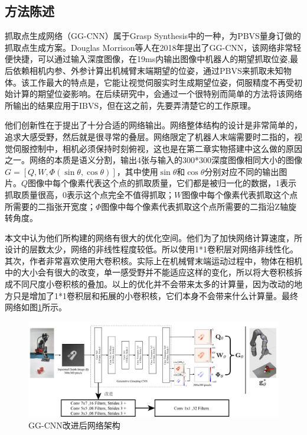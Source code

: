 \documentclass[fontset=fandol,type=bachelor,campus=harbin,bsmainpagenumberline=true]{hithesisbook}
\begin{document}
\subsection{方法陈述}
抓取点生成网络（GG-CNN）属于Grasp Synthesis中的一种，为PBVS量身订做的抓取点生成方案。Douglas Morrison等人在2018年提出了GG-CNN，该网络非常轻便快捷，可以通过输入深度图像，在19ms内输出图像中机器人的期望抓取位姿,最后依赖相机内参、外参计算出机械臂末端期望的位姿，通过PBVS来抓取未知物体\cite{morrison2018closing}。该工作最大的特点是，它能让视觉伺服实时生成期望位姿，伺服精度不再受初始计算的期望位姿影响。在后续研究中，会通过一个很特别而简单的方法将该网络所输出的结果应用于IBVS，但在这之前，先要弄清楚它的工作原理。


他们创新性在于提出了十分合适的网络输出。网络整体结构的设计是非常简单的，追求大感受野，然后就是很寻常的叠层。网络限定了机器人末端需要时二指的，视觉伺服控制中，相机必须保持时刻俯视，这也是在第二章实物搭建中这么做的原因之一。网络的本质是语义分割，输出4张与输入的300*300深度图像相同大小的图像$G=\left[ Q,W,\varPhi \left( \sin \theta ,\cos \theta \right) \right]$，其中使用$\sin \theta$和$\cos \theta$分别对应不同的输出图片。$Q$图像中每个像素代表这个点的抓取质量，它们都是被归一化的数据，1表示抓取质量很高，0表示这个点完全不值得抓取；$W$图像中每个像素代表抓取这个点所需要的二指张开宽度；$\varPhi$图像中每个像素代表抓取这个点所需要的二指沿Z轴旋转角度。


本文中认为他们所构建的网络有很大的优化空间。他们为了加快网络计算速度，所设计的层数太少，网络的非线性程度较低。所以使用1*1卷积层对网络非线性化。其次，作者非常喜欢使用大卷积核。实际上在机械臂末端运动过程中，物体在相机中的大小会有很大的改变，单一感受野并不能适应这样的变化，所以将大卷积核拆成不同尺度小卷积核的叠加。以上的优化并不会带来太多的计算量，因为改动的地方只是增加了1*1卷积层和拓展的小卷积核，它们本身不会带来什么计算量。最终网络如图\ref{GG-CNN改进}所示。
\begin{figure}[h]
\centering
\includegraphics[width = 1.0\textwidth]{chapter3/GG-CNN改进}
\caption{GG-CNN改进后网络架构}
\label{GG-CNN改进}
\end{figure}
\end{document}
